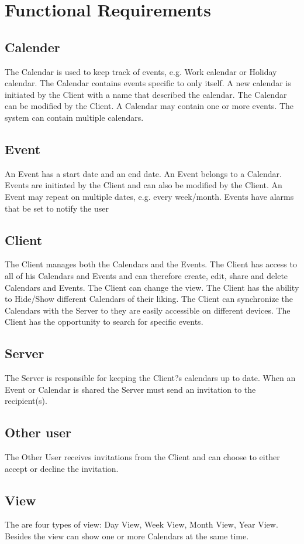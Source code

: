 \section{Functional Requirements}

\subsection*{Calender}
The Calendar is used to keep track of events, e.g. Work calendar or Holiday calendar. The Calendar contains events specific to only itself.
A new calendar is initiated by the Client with a name that described the calendar. The Calendar can be modified by the Client.
 A Calendar may contain one or more events. The system can contain multiple calendars.

\subsection*{Event}
An Event has a start date and an end date.
An Event belongs to a Calendar. Events are initiated by the Client and can also be modified by the Client.
An Event may repeat on multiple dates, e.g. every week/month.
Events have alarms that be set to notify the user

\subsection*{Client}
The Client manages both the Calendars and the Events.
The Client has access to all of his Calendars and Events and can therefore create, edit, share and delete Calendars and Events.
The Client can change the view.
The Client has the ability to Hide/Show different Calendars of their liking.
The Client can synchronize the Calendars with the Server to they are easily accessible on different devices.
The Client has the opportunity to search for specific events.

\subsection*{Server}
The Server is responsible for keeping the Client?s calendars up to date.
When an Event or Calendar is shared the Server must send an invitation to the recipient(s).

\subsection*{Other user}
The Other User receives invitations from the Client and can choose to either accept or decline the invitation.

\subsection*{View}
The are four types of view: Day View, Week View, Month View, Year View.
Besides the view can show one or more Calendars at the same time.